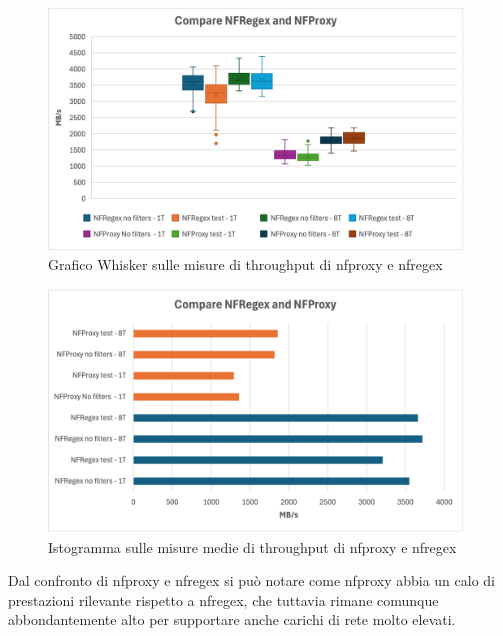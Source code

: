 \begin{figure}[H]
    \centering
    \includegraphics[width=0.98\textwidth]{images/chapter4/whisker_compare.png}
    \caption{Grafico Whisker sulle misure di throughput di nfproxy e nfregex}\label{fig:wisker_nfproxy_nfregex}
\end{figure}

\begin{figure}[H]
    \centering
    \includegraphics[width=0.98\textwidth]{images/chapter4/istrogramma_compare.png}
    \caption{Istogramma sulle misure medie di throughput di nfproxy e nfregex}\label{fig:istogramma_nfproxy_nfregex}
\end{figure}

Dal confronto di nfproxy e nfregex si può notare come nfproxy abbia un calo di prestazioni rilevante rispetto a nfregex, che tuttavia
rimane comunque abbondantemente alto per supportare anche carichi di rete molto elevati.\\
